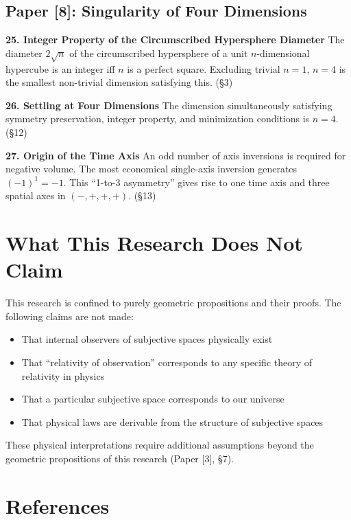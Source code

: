 \documentclass[12pt,a4paper]{article}
\begin{document}
\subsection*{Paper [8]: Singularity of Four Dimensions}

\textbf{25. Integer Property of the Circumscribed Hypersphere Diameter}\quad
The diameter $2\sqrt{n}$ of the circumscribed hypersphere of a unit $n$-dimensional hypercube is an integer iff $n$ is a perfect square. Excluding trivial $n = 1$, $n = 4$ is the smallest non-trivial dimension satisfying this. (\S 3)

\textbf{26. Settling at Four Dimensions}\quad
The dimension simultaneously satisfying symmetry preservation, integer property, and minimization conditions is $n = 4$. (\S 12)

\textbf{27. Origin of the Time Axis}\quad
An odd number of axis inversions is required for negative volume. The most economical single-axis inversion generates $(-1)^1 = -1$. This ``1-to-3 asymmetry'' gives rise to one time axis and three spatial axes in $(-,+,+,+)$. (\S 13)

\section*{What This Research Does Not Claim}

This research is confined to purely geometric propositions and their proofs. The following claims are not made:

\begin{itemize}
  \item That internal observers of subjective spaces physically exist
  \item That ``relativity of observation'' corresponds to any specific theory of relativity in physics
  \item That a particular subjective space corresponds to our universe
  \item That physical laws are derivable from the structure of subjective spaces
\end{itemize}

These physical interpretations require additional assumptions beyond the geometric propositions of this research (Paper [3], \S 7).

\section*{References}
\end{document}
